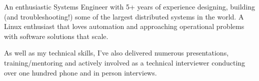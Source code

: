 

\begin{cvparagraph}

An enthusiastic Systems Engineer with 5+ years of experience designing, building (and troubleshooting!) some of the largest distributed systems in the world. A Linux enthusiast that loves automation and approaching operational problems with software solutions that scale.

As well as my technical skills, I've also delivered numerous presentations, training/mentoring and actively involved as a technical interviewer conducting over one hundred phone and in person interviews.

\end{cvparagraph}
